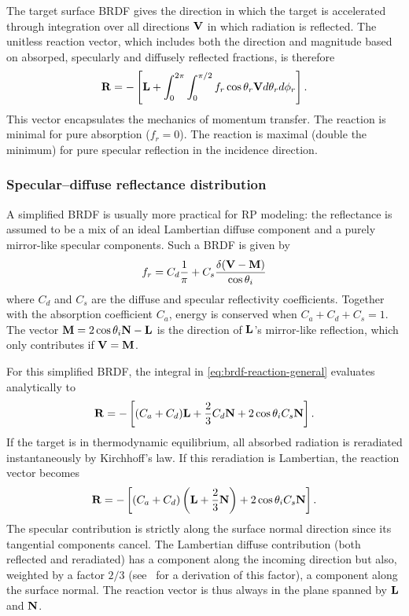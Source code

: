 The target surface \gls{BRDF} gives the direction in which the target is accelerated through integration over all directions $\vb V$ in which radiation is reflected. The unitless reaction vector, which includes both the direction and magnitude based on absorped, specularly and diffusely reflected fractions, is therefore~\cite{Wetterer2014}
\begin{align}
    \label{eq:brdf-reaction-general}
    \vb R = -\left[ \vb L + \int_{0}^{2\pi} \int_{0}^{\pi/2} f_r \cos\theta_r \vb V d\theta_r d\phi_r \right].
\end{align}
This vector encapsulates the mechanics of momentum transfer. The reaction is minimal for pure absorption ($f_r = 0$). The reaction is maximal (double the minimum) for pure specular reflection in the incidence direction.

\subsubsection{Specular--diffuse reflectance distribution}
A simplified \gls{BRDF} is usually more practical for \gls{RP} modeling: the reflectance is assumed to be a mix of an ideal Lambertian diffuse component and a purely mirror-like specular components. Such a \gls{BRDF} is given by~\cite{Wetterer2014}
\begin{align}
    \label{eq:brdf-specular-diffuse}
    f_r = C_d \frac{1}{\pi} + C_s \frac{\delta(\vb V - \vb M)}{\cos \theta_i}
\end{align}
where $C_d$ and $C_s$ are the diffuse and specular reflectivity coefficients. Together with the absorption coefficient $C_a$, energy is conserved when $C_a + C_d + C_s = 1$. The vector $\vb M = 2\cos\theta_i\vb N - \vb L$ is the direction of $\vb L$'s mirror-like reflection, which only contributes if $\vb V = \vb M$.

For this simplified \gls{BRDF}, the integral in \cref{eq:brdf-reaction-general} evaluates analytically to~\cite{Montenbruck2014}
\begin{align}
    \label{eq:brdf-reaction-specular-diffuse}
    \vb R = - \left[ (C_a + C_d) \vb L + \frac{2}{3} C_d \vb N + 2 \cos\theta_i C_s \vb N \right].
\end{align}
If the target is in thermodynamic equilibrium, all absorbed radiation is reradiated instantaneously by Kirchhoff's law. If this reradiation is Lambertian, the reaction vector becomes~\cite{Montenbruck2014}
\begin{align}
    \label{eq:brdf-reaction-specular-diffuse-instrerad}
    \vb R = - \left[ (C_a + C_d) \left(\vb L + \frac{2}{3} \vb N\right) + 2 \cos\theta_i C_s \vb N \right].
\end{align}
The specular contribution is strictly along the surface normal direction since its tangential components cancel. The Lambertian diffuse contribution (both reflected and reradiated) has a component along the incoming direction but also, weighted by a factor $2/3$ (see~\cite{Ziebart2004} for a derivation of this factor), a component along the surface normal. The reaction vector is thus always in the plane spanned by $\vb L$ and $\vb N$.



